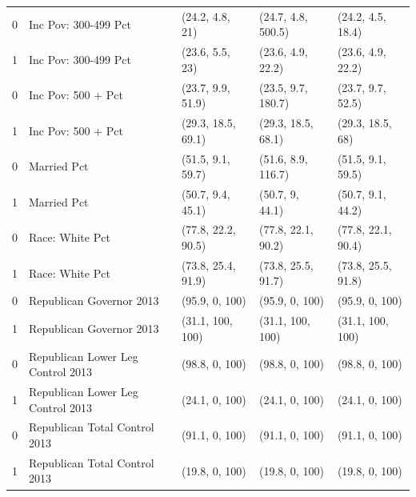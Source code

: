 \begin{table}[h!]
\begin{tabular}{rllll}
  0 & Inc Pov: 300-499 Pct & (24.2, 4.8, 21) & (24.7, 4.8, 500.5) & (24.2, 4.5, 18.4) \\ 
  1 & Inc Pov: 300-499 Pct & (23.6, 5.5, 23) & (23.6, 4.9, 22.2) & (23.6, 4.9, 22.2) \\ 
  0 & Inc Pov: 500 + Pct & (23.7, 9.9, 51.9) & (23.5, 9.7, 180.7) & (23.7, 9.7, 52.5) \\ 
  1 & Inc Pov: 500 + Pct & (29.3, 18.5, 69.1) & (29.3, 18.5, 68.1) & (29.3, 18.5, 68) \\ 
  0 & Married Pct & (51.5, 9.1, 59.7) & (51.6, 8.9, 116.7) & (51.5, 9.1, 59.5) \\ 
  1 & Married Pct & (50.7, 9.4, 45.1) & (50.7, 9, 44.1) & (50.7, 9.1, 44.2) \\ 
  0 & Race: White Pct & (77.8, 22.2, 90.5) & (77.8, 22.1, 90.2) & (77.8, 22.1, 90.4) \\ 
  1 & Race: White Pct & (73.8, 25.4, 91.9) & (73.8, 25.5, 91.7) & (73.8, 25.5, 91.8) \\ 
  0 & Republican Governor 2013 & (95.9, 0, 100) & (95.9, 0, 100) & (95.9, 0, 100) \\ 
  1 & Republican Governor 2013 & (31.1, 100, 100) & (31.1, 100, 100) & (31.1, 100, 100) \\ 
  0 & Republican Lower Leg Control 2013 & (98.8, 0, 100) & (98.8, 0, 100) & (98.8, 0, 100) \\ 
  1 & Republican Lower Leg Control 2013 & (24.1, 0, 100) & (24.1, 0, 100) & (24.1, 0, 100) \\ 
  0 & Republican Total Control 2013 & (91.1, 0, 100) & (91.1, 0, 100) & (91.1, 0, 100) \\ 
  1 & Republican Total Control 2013 & (19.8, 0, 100) & (19.8, 0, 100) & (19.8, 0, 100) \\ 
   \hline
\end{tabular}
\end{table}

